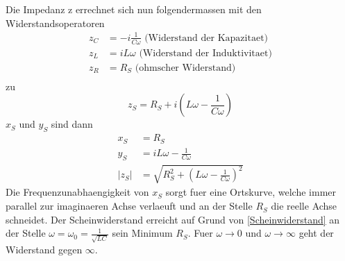 \documentclass[titlepage=firstcover, captions=tableheading]{scrartcl}
\begin{document}
Die Impedanz z errechnet sich nun folgendermassen mit den Widerstandsoperatoren
\begin{align}
    z_C&=-i\frac{1}{C\omega} \text{ (Widerstand der Kapazitaet)} \nonumber \\
    z_L&=iL\omega \text{ (Widerstand der Induktivitaet)}\nonumber \\
    z_R&=R_S \text{ (ohmscher Widerstand)} \nonumber\\
\end{align}
zu 
\begin{equation}
    z_S=R_S+i(L\omega-\frac{1}{C\omega}) \nonumber
\end{equation}
$x_S$ und $y_S$ sind dann
\begin{align}
    x_S&=R_S \nonumber \\
    y_S&=iL\omega-\frac{1}{C\omega} \nonumber \\
    |z_S|&=\sqrt{R_S^2+(L\omega-\frac{1}{C\omega})^2} \label{Scheinwiderstand}
\end{align}
Die Frequenzunabhaengigkeit von $x_S$ sorgt fuer eine Ortskurve, welche immer parallel zur imaginaeren Achse verlaeuft und an der Stelle $R_S$ die reelle Achse schneidet. Der Scheinwiderstand erreicht auf Grund von \ref{Scheinwiderstand} an der Stelle $\omega=\omega_0=\frac{1}{\sqrt{LC}}$ sein Minimum $R_S$. Fuer $\omega\rightarrow 0$ und $\omega\rightarrow\infty$ geht der Widerstand gegen $\infty$. 
\end{document}
